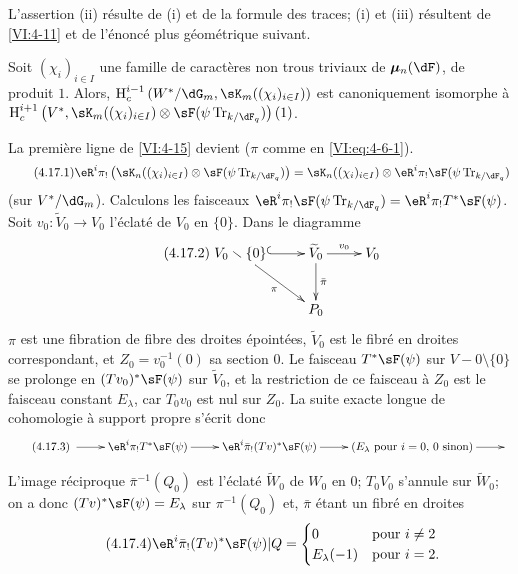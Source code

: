 L'assertion (ii) résulte de (i) et de la formule des traces; (i) et (iii) 
résultent de \ref{VI:4-11} et de l'énoncé plus géométrique suivant. 





\begin{proposition_}\label{VI:4-17}
Soit $(\chi_i)_{i\in I}$ une famille de caractères non trous triviaux de 
$\dmu_n(\dF)$, de produit $1$. Alors, 
$\h_c^{i-1}\left(W^\ast/\dG_m,\sK_m((\chi_i)_{i\in I})\right)$ est 
canoniquement isomorphe à 
\newline
$\h_c^{i+1}\left(V^\ast,\sK_m((\chi_i)_{i\in I})\otimes \sF(\psi\tr_{k/\dF_q})\right)(1)$. 
\end{proposition_}

La première ligne de \ref{VI:4-15} devient ($\pi$ comme en 
\eqref{VI:eq:4-6-1}). 
\begin{equation*}\tag{4.17.1}\label{VI:eq:4-17-1}
  \eR^i \pi_!\left(\sK_n((\chi_i)_{i\in I})\otimes \sF(\psi \tr_{k/\dF_q})\right) = \sK_n((\chi_i)_{i\in I}) \otimes \eR^i \pi_! \sF(\psi\tr_{k/\dF_q}) 
\end{equation*}
(sur $V^\ast/\dG_m$). Calculons les faisceaux 
$\eR^i\pi_! \sF(\psi\tr_{k/\dF_q}) = \eR^i \pi_! T^\ast \sF(\psi)$. Soit 
$v_0:\widetilde V_0 \to V_0$ l'éclaté de $V_0$ en $\{0\}$. Dans le 
diagramme 
\begin{equation*}\tag{4.17.2}\label{VI:eq:4-17-2}
\xymatrix{
  V_0\setminus \{0\} \ar@{^{(}->}[r] \ar[dr]_-\pi 
    & \widetilde V_0 \ar[r]^-{v_0} \ar[d]^-{\bar\pi} 
    & V_0 \\
  & P_0 
}
\end{equation*}
$\pi$ est une fibration de fibre des droites épointées, $\widetilde V_0$ 
est le fibré en droites correspondant, et $Z_0=v_0^{-1}(0)$ sa section $0$. 
Le faisceau $T^\ast\sF(\psi)$ sur $V-0\setminus \{0\}$ se prolonge en 
$(T v_0)^\ast \sF(\psi)$ sur $\widetilde V_0$, et la restriction de ce faisceau 
à $Z_0$ est le faisceau constant $E_\lambda$, car $T_0 v_0$ est nul sur 
$Z_0$. La suite exacte longue de cohomologie à support propre s'écrit 
donc 
\begin{equation*}\tag{4.17.3}\label{VI:eq:4-17-3}
\xymatrix{
  \ar[r] 
    & \eR^i \pi_! T^\ast \sF(\psi) \ar[r] 
    & \eR^i \bar\pi_! (T v)^\ast \sF(\psi) \ar[r] 
    & (E_\lambda\text{ pour $i=0$, $0$ sinon}) \ar[r] 
    & 
}
\end{equation*}

L'image réciproque $\bar\pi^{-1}(Q_0)$ est l'éclaté $\widetilde W_0$ de 
$W_0$ en $0$; $T_0 V_0$ s'annule sur $\widetilde W_0$; on a donc 
$(T v)^\ast \sF(\psi)=E_\lambda$ sur $\pi^{-1}(Q_0)$ et, $\bar\pi$ étant un 
fibré en droites 
\begin{equation*}\tag{4.17.4}\label{VI:eq:4-17-4}
  \eR^i \bar\pi_! (T v)^\ast \sF(\psi)|Q = 
    \begin{cases}
      0 & \text{pour $i\ne 2$} \\
      E_\lambda(-1) & \text{pour $i=2$.} 
    \end{cases} 
\end{equation*}

